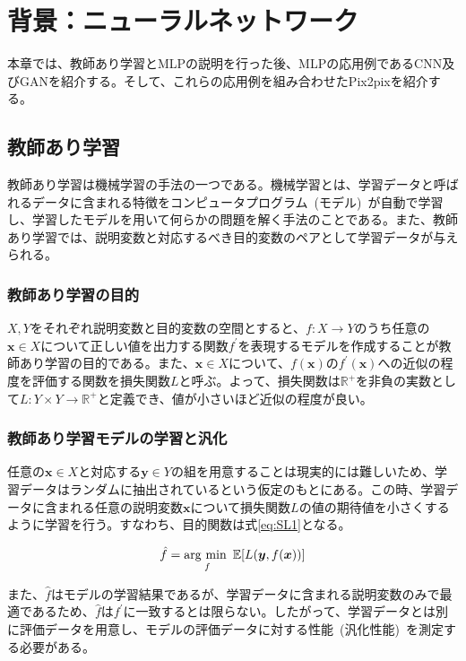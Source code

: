 \chapter{背景：ニューラルネットワーク}

本章では、教師あり学習とMLPの説明を行った後、MLPの応用例であるCNN及びGANを紹介する。そして、これらの応用例を組み合わせたPix2pixを紹介する。

\section{教師あり学習}

教師あり学習は機械学習の手法の一つである。機械学習とは、学習データと呼ばれるデータに含まれる特徴をコンピュータプログラム~(モデル)~が自動で学習し、学習したモデルを用いて何らかの問題を解く手法のことである。また、教師あり学習では、説明変数と対応するべき目的変数のペアとして学習データが与えられる。

\subsection{教師あり学習の目的}

$X,Y$をそれぞれ説明変数と目的変数の空間とすると、$f:X\rightarrow Y$のうち任意の$\boldsymbol{x} \in X$について正しい値を出力する関数$f^{'}$を表現するモデルを作成することが教師あり学習の目的である。また、$\boldsymbol{x} \in X$について、$f(\boldsymbol{x})$の$f^{'}(\boldsymbol{x})$への近似の程度を評価する関数を損失関数$L$と呼ぶ。よって、損失関数は$\mathbb{R}^+$を非負の実数として$L:Y \times Y \rightarrow \mathbb{R}^+$と定義でき、値が小さいほど近似の程度が良い。

\subsection{教師あり学習モデルの学習と汎化}

任意の$\boldsymbol{x} \in X$と対応する$\boldsymbol{y} \in Y$の組を用意することは現実的には難しいため、学習データはランダムに抽出されているという仮定のもとにある。この時、学習データに含まれる任意の説明変数$\boldsymbol{x}$について損失関数$L$の値の期待値を小さくするように学習を行う。すなわち、目的関数は式\ref{eq:SL1}となる。

\begin{align}
    \label{eq:SL1}
    \hat{f}=\mathop{\rm arg~min~}\limits _{f} \mathbb{E}[L(\boldsymbol{y},f(\boldsymbol{x}))]
\end{align}

また、$\hat{f}$はモデルの学習結果であるが、学習データに含まれる説明変数のみで最適であるため、$\hat{f}$は$f^{'}$に一致するとは限らない。したがって、学習データとは別に評価データを用意し、モデルの評価データに対する性能~(汎化性能)~を測定する必要がある。

